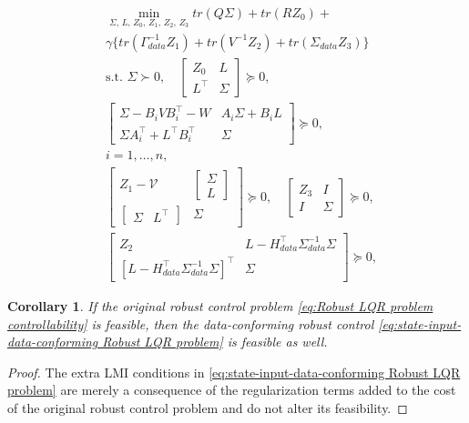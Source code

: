 \documentclass[10pt,a4paper]{amsart}
\newtheorem{corollary}{Corollary}
\newcommand{\trace}{\textit{tr}}
\begin{document}
\begin{equation} \label{eq:state-input-data-conforming Robust LQR problem}
    \begin{aligned}
         &\min_{\Sigma ,\,L,\,Z_0,\,Z_1,\,Z_2,\,Z_3} \trace \left (  Q\Sigma  \right ) + \trace \left ( R Z_0 \right) + \\
         &\gamma \Big \{ \trace \left ( \Gamma_{data}^{-1} Z_1 \right) + \trace \left ( V^{-1} Z_2 \right) + \trace \left ( \Sigma_{data} Z_3 \right) \Big \} \\
        &\text{s.t. } \Sigma \succ 0, \quad
        \begin{bmatrix}
            Z_0 & L\\
            L^\top & \Sigma 
        \end{bmatrix}\succeq 0,\\
        &\begin{bmatrix}
        \Sigma-B_i V B_i^\top-W & A_i \Sigma + B_i L \\
        \Sigma A_i^\top + L^\top B_i^\top & \Sigma
    \end{bmatrix} \succeq 0, \\
    &i=1,\hdots,n,\\
    &\begin{bmatrix}
        Z_1 - 
        \mathcal{V}
    & \begin{bmatrix}
        \Sigma\\
        L
    \end{bmatrix}\\
    \begin{bmatrix}
        \Sigma & L^\top
    \end{bmatrix} & \Sigma
\end{bmatrix} \succeq 0, \quad
\begin{bmatrix}
        Z_3 & I \\
    I & \Sigma
\end{bmatrix} \succeq 0, \\
&
\begin{bmatrix}
        Z_2 & L- H_{data}^\top \Sigma_{data}^{-1} \Sigma \\ 
        \left[L- H_{data}^\top \Sigma_{data}^{-1} \Sigma\right]^\top & \Sigma
    \end{bmatrix} \succeq 0,
    \end{aligned}
\end{equation}

\begin{corollary}
    If the original robust control problem \eqref{eq:Robust LQR problem controllability} is feasible, then the data-conforming robust control \eqref{eq:state-input-data-conforming Robust LQR problem} is feasible as well.
\end{corollary}

\begin{proof}
    The extra LMI conditions in \eqref{eq:state-input-data-conforming Robust LQR problem} are merely a consequence of the regularization terms added to the cost of the original robust control problem and do not alter its feasibility.
\end{proof}
\end{document}
